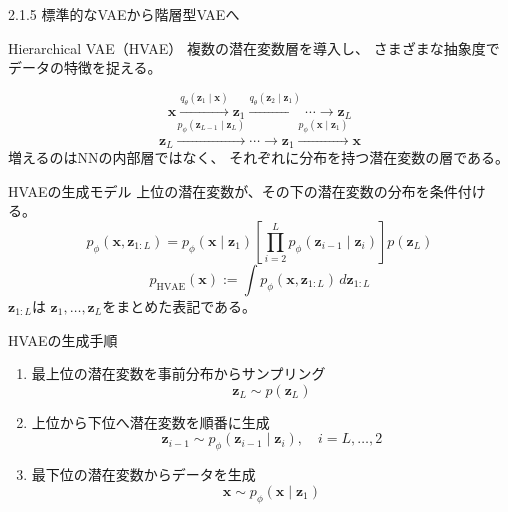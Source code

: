 \begin{frame}{2.1.5 標準的なVAEから階層型VAEへ}
    \begin{block}{Hierarchical VAE（HVAE）}
        複数の潜在変数層を導入し、
        さまざまな抽象度でデータの特徴を捉える。
    \end{block}
    \[
        \boldsymbol{x}
        \xrightarrow{q_\theta(\boldsymbol{z}_1\mid\boldsymbol{x})}
        \boldsymbol{z}_1
        \xrightarrow{q_\theta(\boldsymbol{z}_2\mid\boldsymbol{z}_1)}
        \cdots
        \longrightarrow
        \boldsymbol{z}_L
    \]
    \[
        \boldsymbol{z}_L
        \xrightarrow{p_\phi(\boldsymbol{z}_{L-1}\mid\boldsymbol{z}_L)}
        \cdots
        \longrightarrow
        \boldsymbol{z}_1
        \xrightarrow{p_\phi(\boldsymbol{x}\mid\boldsymbol{z}_1)}
        \boldsymbol{x}
    \]
    増えるのはNNの内部層ではなく、
    それぞれに分布を持つ潜在変数の層である。
\end{frame}
\begin{frame}{HVAEの生成モデル}
    上位の潜在変数が、その下の潜在変数の分布を条件付ける。
    \small
    \[
        \boxed{
        p_\phi(\boldsymbol{x},\boldsymbol{z}_{1:L})
        =
        p_\phi(\boldsymbol{x}\mid\boldsymbol{z}_1)
        \left[
        \prod_{i=2}^{L}
        p_\phi(\boldsymbol{z}_{i-1}\mid\boldsymbol{z}_i)
        \right]
        p(\boldsymbol{z}_L)
        }
    \]
    \[
        p_{\mathrm{HVAE}}(\boldsymbol{x})
        :=
        \int p_\phi(\boldsymbol{x},\boldsymbol{z}_{1:L})
        \,d\boldsymbol{z}_{1:L}
    \]
    \normalsize
    $\boldsymbol{z}_{1:L}$は
    $\boldsymbol{z}_1,\ldots,\boldsymbol{z}_L$をまとめた表記である。
\end{frame}
\begin{frame}{HVAEの生成手順}
    \begin{enumerate}
        \item 最上位の潜在変数を事前分布からサンプリング
        \[
            \boldsymbol{z}_L\sim p(\boldsymbol{z}_L)
        \]
        \item 上位から下位へ潜在変数を順番に生成
        \[
            \boldsymbol{z}_{i-1}
            \sim p_\phi(\boldsymbol{z}_{i-1}\mid\boldsymbol{z}_i),
            \quad i=L,\ldots,2
        \]
        \item 最下位の潜在変数からデータを生成
        \[
            \boldsymbol{x}
            \sim p_\phi(\boldsymbol{x}\mid\boldsymbol{z}_1)
        \]
    \end{enumerate}
\end{frame}
